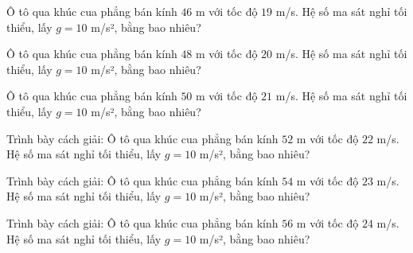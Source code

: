 \begin{ex}
Ô tô qua khúc cua phẳng bán kính $46$ m với tốc độ $19$ m/s. Hệ số ma sát nghỉ tối thiểu, lấy $g=10$ m/s², bằng bao nhiêu?
\end{ex}

\begin{ex}
Ô tô qua khúc cua phẳng bán kính $48$ m với tốc độ $20$ m/s. Hệ số ma sát nghỉ tối thiểu, lấy $g=10$ m/s², bằng bao nhiêu?
\end{ex}

\begin{ex}
Ô tô qua khúc cua phẳng bán kính $50$ m với tốc độ $21$ m/s. Hệ số ma sát nghỉ tối thiểu, lấy $g=10$ m/s², bằng bao nhiêu?
\end{ex}

\begin{bt}
Trình bày cách giải: Ô tô qua khúc cua phẳng bán kính $52$ m với tốc độ $22$ m/s. Hệ số ma sát nghỉ tối thiểu, lấy $g=10$ m/s², bằng bao nhiêu?
\end{bt}

\begin{bt}
Trình bày cách giải: Ô tô qua khúc cua phẳng bán kính $54$ m với tốc độ $23$ m/s. Hệ số ma sát nghỉ tối thiểu, lấy $g=10$ m/s², bằng bao nhiêu?
\end{bt}

\begin{bt}
Trình bày cách giải: Ô tô qua khúc cua phẳng bán kính $56$ m với tốc độ $24$ m/s. Hệ số ma sát nghỉ tối thiểu, lấy $g=10$ m/s², bằng bao nhiêu?
\end{bt}


